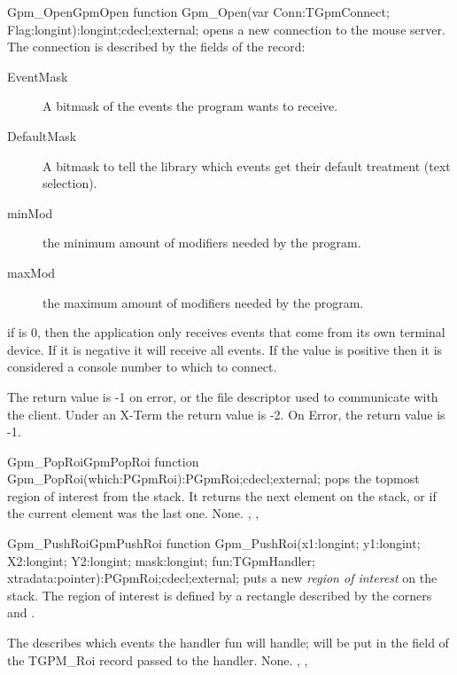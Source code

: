 \begin{functionl}{Gpm\_Open}{GpmOpen}
\Declaration
function Gpm\_Open(var Conn:TGpmConnect; Flag:longint):longint;cdecl;external;
\Description
{} opens a new connection to the mouse server. The connection
is described by the fields of the  record:
\begin{description}
\item[EventMask] A bitmask of the events the program wants to receive.
\item[DefaultMask] A bitmask to tell the library which events get their
default treatment (text selection).
\item[minMod] the minimum amount of modifiers needed by the program.
\item[maxMod] the maximum amount of modifiers needed by the program.
\end{description}
if  is 0, then the application only receives events that come from
its own terminal device. If it is negative it will receive all events. If
the value is positive then it is considered a console number to which to
connect.

The return value is -1 on error, or the file descriptor used to communicate
with the client. Under an X-Term the return value is -2.
\Errors
On Error, the return value is -1.
\SeeAlso
{}
\end{functionl}

\begin{functionl}{Gpm\_PopRoi}{GpmPopRoi}
\Declaration
function Gpm\_PopRoi(which:PGpmRoi):PGpmRoi;cdecl;external;
\Description
{} pops the topmost region of interest from the stack.
It returns the next element on the stack, or  if the current 
element was the last one.
\Errors
None.
\SeeAlso
{},
, 
\end{functionl}

\begin{functionl}{Gpm\_PushRoi}{GpmPushRoi}
\Declaration
function Gpm\_PushRoi(x1:longint; y1:longint; X2:longint; Y2:longint; mask:longint; fun:TGpmHandler; xtradata:pointer):PGpmRoi;cdecl;external;
\Description
{} puts a new {\em region of interest} on the stack.
The region of interest is defined by a rectangle described by the corners
 and . 

The  describes which events the handler {fun} will handle;
 will be put in the  field of the {TGPM\_Roi} 
record passed to the  handler.
\Errors
None.
\SeeAlso
{},
, 
\end{functionl}

